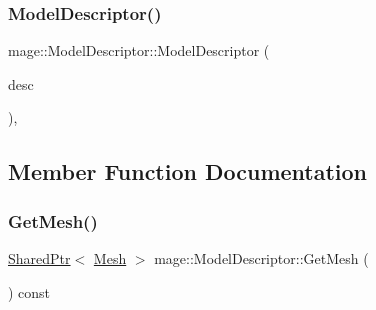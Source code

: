 \hypertarget{classmage_1_1_model_descriptor_a0b9c94c989ef70b6149a571106a1a73c}{}\label{classmage_1_1_model_descriptor_a0b9c94c989ef70b6149a571106a1a73c} 
\subsubsection{\texorpdfstring{Model\+Descriptor()}{ModelDescriptor()}\hspace{0.1cm}{\footnotesize\ttfamily [3/3]}}
{\footnotesize\ttfamily mage\+::\+Model\+Descriptor\+::\+Model\+Descriptor (\begin{DoxyParamCaption}\item[{\hyperlink{classmage_1_1_model_descriptor}{Model\+Descriptor} \&\&}]{desc }\end{DoxyParamCaption})\hspace{0.3cm}{\ttfamily [private]}, {\ttfamily [delete]}}



\subsection{Member Function Documentation}
\hypertarget{classmage_1_1_model_descriptor_a325f0e58fda7734ace7a0e296e0d970d}{}\label{classmage_1_1_model_descriptor_a325f0e58fda7734ace7a0e296e0d970d} 
\subsubsection{\texorpdfstring{Get\+Mesh()}{GetMesh()}}
{\footnotesize\ttfamily \hyperlink{namespacemage_a1e01ae66713838a7a67d30e44c67703e}{Shared\+Ptr}$<$ \hyperlink{classmage_1_1_mesh}{Mesh} $>$ mage\+::\+Model\+Descriptor\+::\+Get\+Mesh (\begin{DoxyParamCaption}{ }\end{DoxyParamCaption}) const}

\hypertarget{classmage_1_1_model_descriptor_a64a2ca531c03cd8d79eda3a728e6efa1}{}\label{classmage_1_1_model_descriptor_a64a2ca531c03cd8d79eda3a728e6efa1} 
